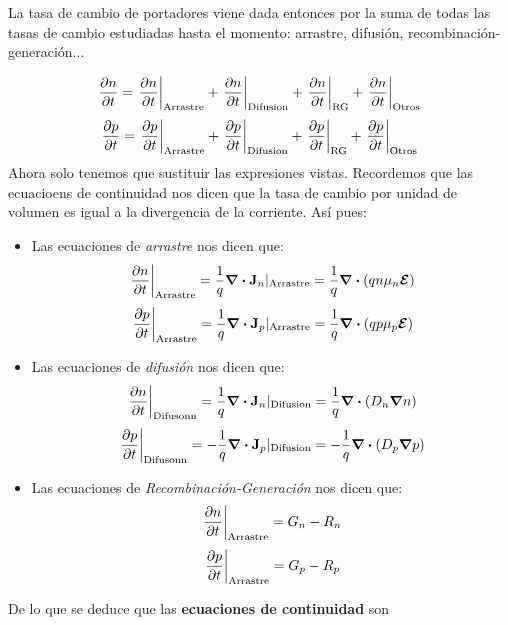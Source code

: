 La tasa de cambio de portadores viene dada entonces por la suma de todas las tasas de cambio estudiadas hasta el momento: arrastre, difusión, recombinación-generación...

\begin{equation}
	\parciales{n}{t} = \eval{\parciales{n}{t}}_{\text{Arrastre}}+\eval{\parciales{n}{t}}_{\text{Difusion}}+\eval{\parciales{n}{t}}_{\text{RG}}+\eval{\parciales{n}{t}}_{\text{Otros}}
\end{equation}
\begin{equation}
	\parciales{p}{t} = \eval{\parciales{p}{t}}_{\text{Arrastre}}+\eval{\parciales{p}{t}}_{\text{Difusion}}+\eval{\parciales{p}{t}}_{\text{RG}}+\eval{\parciales{p}{t}}_{\text{Otros}}
\end{equation}
Ahora solo tenemos que sustituir las expresiones vistas. Recordemos que las ecuacioens de continuidad nos dicen que la tasa de cambio por unidad de volumen es igual a la divergencia de la corriente. Así pues: 

\begin{itemize}
	\item Las ecuaciones de \textit{arrastre} nos dicen que:
	\begin{equation}
		\eval{\parciales{n}{t}}_{\text{Arrastre}} = \frac{1}{q} \div  \Jn_n |_{\text{Arrastre}} = \frac{1}{q} \div \parentesis{qn\mu_n \Encal}
	\end{equation}
	\begin{equation}
		\eval{\parciales{p}{t}}_{\text{Arrastre}} = \frac{1}{q} \div  \Jn_p|_{\text{Arrastre}} = \frac{1}{q} \div \parentesis{qp\mu_p \Encal}
	\end{equation}
	\item Las ecuaciones de \textit{difusión} nos dicen que:
	\begin{equation}
		\eval{\parciales{n}{t}}_{\text{Difusonn}} = \frac{1}{q} \div  \Jn_n|_{\text{Difusion}} = \frac{1}{q} \div \parentesis{D_n \grad n}
	\end{equation}
	\begin{equation}
		\eval{\parciales{p}{t}}_{\text{Difusonn}} = - \frac{1}{q} \div  \Jn_p|_{\text{Difusion}} = - \frac{1}{q} \div \parentesis{D_p\grad p}
	\end{equation}
	\item Las ecuaciones de \textit{Recombinación-Generación} nos dicen que:
	\begin{equation}
		\eval{\parciales{n}{t}}_{\text{Arrastre}} = G_n - R_n
	\end{equation}
	\begin{equation}
		\eval{\parciales{p}{t}}_{\text{Arrastre}} = G_p - R_p
	\end{equation}
\end{itemize}
De lo que se deduce que las \textbf{ecuaciones de continuidad} son

